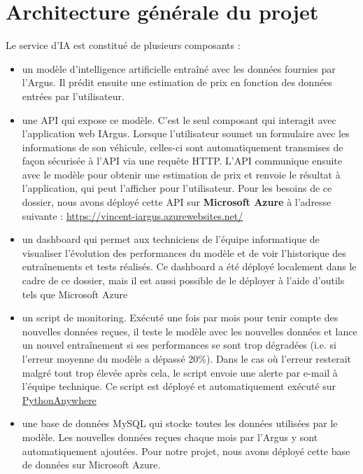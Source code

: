 \documentclass[french]{article}
\begin{document}
    \section{Architecture générale du projet}
    Le service d'IA est constitué de plusieurs composants :
    \begin{itemize}
        \item un modèle d'intelligence artificielle entraîné avec les données fournies par l'Argus. Il prédit ensuite une estimation de prix en fonction des données entrées par l'utilisateur.
        \item une API qui expose ce modèle. C'est le seul composant qui interagit avec l'application web IArgus. Lorsque l'utilisateur soumet un formulaire avec les informations de son véhicule, celles-ci sont automatiquement transmises de façon sécurisée à l'API via une requête HTTP. L'API communique ensuite avec le modèle pour obtenir une estimation de prix et renvoie le résultat à l'application, qui peut l'afficher pour l'utilisateur. Pour les besoins de ce dossier, nous avons déployé cette API sur \textbf{Microsoft Azure} à l'adresse suivante : \href{https://vincent-iargus.azurewebsites.net/}{https://vincent-iargus.azurewebsites.net/} 
        \item un dashboard qui permet aux techniciens de l'équipe informatique de visualiser l'évolution des performances du modèle et de voir l'historique des entraînements et tests réalisés. Ce dashboard a été déployé localement dans le cadre de ce dossier, mais il est aussi possible de le déployer à l'aide d'outils tels que Microsoft Azure
        \item un script de monitoring. Exécuté une fois par mois pour tenir compte des nouvelles données reçues, il teste le modèle avec les nouvelles données et lance un nouvel entraînement si ses performances se sont trop dégradées (i.e. si l'erreur moyenne du modèle a dépassé 20\%). Dans le cas où l'erreur resterait malgré tout trop élevée après cela, le script envoie une alerte par e-mail à l'équipe technique. Ce script est déployé et automatiquement exécuté sur \href{https://www.pythonanywhere.com/}{PythonAnywhere}
        \item une base de données MySQL qui stocke toutes les données utilisées par le modèle. Les nouvelles données reçues chaque mois par l'Argus y sont automatiquement ajoutées. Pour notre projet, nous avons déployé cette base de données sur Microsoft Azure.
    \end{itemize}
\end{document}
